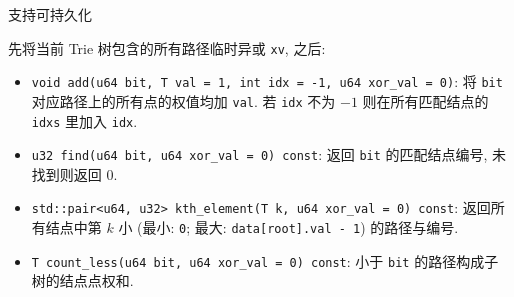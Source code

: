 支持可持久化

先将当前 Trie 树包含的所有路径临时异或 \verb|xv|, 之后:

\begin{itemize}
    \item \verb|void add(u64 bit, T val = 1, int idx = -1, u64 xor_val = 0)|: 将 \verb|bit| 对应路径上的所有点的权值均加 \verb|val|. 若 \verb|idx| 不为 \(-1\) 则在所有匹配结点的 \verb|idxs| 里加入 \verb|idx|.
    \item \verb|u32 find(u64 bit, u64 xor_val = 0) const|: 返回 \verb|bit| 的匹配结点编号, 未找到则返回 \(0\).
    \item \verb|std::pair<u64, u32> kth_element(T k, u64 xor_val = 0) const|: 返回所有结点中第 \(k\) 小 (最小: \verb|0|; 最大: \verb|data[root].val - 1|) 的路径与编号.
    \item \verb|T count_less(u64 bit, u64 xor_val = 0) const|: 小于 \verb|bit| 的路径构成子树的结点点权和.
\end{itemize}
